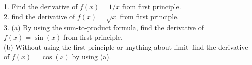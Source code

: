 1. Find the derivative of $f(x)=1/x$ from first principle.\\
2. find the derivative of $f(x)=\sqrt x$ from first principle.\\
3. (a) By using the sum-to-product formula, find the derivative of $f(x)=\sin(x)$ from first principle.\\
(b) Without using the first principle or anything about limit, find the derivative of $f(x)=\cos(x)$ by using (a).